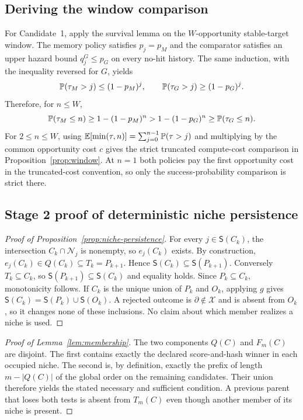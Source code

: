 \subsection{Deriving the window comparison}
For Candidate~1, apply the survival lemma on the $W$-opportunity stable-target
window. The memory policy satisfies $p_j=p_M$ and the comparator satisfies
an upper hazard bound $q_j^G\leq p_G$ on every no-hit history. The same
induction, with the inequality reversed for $G$, yields
\[
 \mathbb{P}(\tau_M>j)\leq(1-p_M)^j,
 \qquad
 \mathbb{P}(\tau_G>j)\geq(1-p_G)^j.
\]
Therefore, for $n\leq W$,
\[
 \mathbb{P}(\tau_M\leq n)\geq1-(1-p_M)^n
 >1-(1-p_G)^n\geq\mathbb{P}(\tau_G\leq n).
\]
For $2\leq n\leq W$, using
$\mathbb{E}[\min(\tau,n)]=\sum_{j=0}^{n-1}\mathbb{P}(\tau>j)$ and multiplying by the
common opportunity cost $c$ gives the strict truncated compute-cost comparison in
Proposition~\ref{prop:window}. At $n=1$ both policies pay the first opportunity
cost in the truncated-cost convention, so only the success-probability
comparison is strict there.

\subsection{Stage 2 proof of deterministic niche persistence}
\begin{proof}[Proof of Proposition~\ref{prop:niche-persistence}]
For every $j\in\mathsf S(C_k)$, the intersection
$C_k\cap\mathcal N_j$ is nonempty, so $e_j(C_k)$ exists. By construction,
$e_j(C_k)\in Q(C_k)\subseteq T_k=P_{k+1}$. Hence
$\mathsf S(C_k)\subseteq\mathsf S(P_{k+1})$. Conversely $T_k\subseteq C_k$,
so $\mathsf S(P_{k+1})\subseteq\mathsf S(C_k)$ and equality holds. Since
$P_k\subseteq C_k$, monotonicity follows. If $C_k$ is the unique union of
$P_k$ and $O_k$, applying $g$ gives
$\mathsf S(C_k)=\mathsf S(P_k)\cup\mathsf S(O_k)$. A rejected outcome is
$\partial\notin\mathcal X$ and is absent from $O_k$, so it changes none of
these inclusions. No claim about which member realizes a niche is used.
\end{proof}

\begin{proof}[Proof of Lemma~\ref{lem:membership}]
The two components $Q(C)$ and $F_m(C)$ are disjoint. The first contains exactly
the declared score-and-hash winner in each occupied niche. The second is, by
definition, exactly the prefix of length $m-|Q(C)|$ of the global order on the
remaining candidates. Their union therefore yields the stated necessary and
sufficient condition. A previous parent that loses both tests is absent from
$T_m(C)$ even though another member of its niche is present.
\end{proof}

